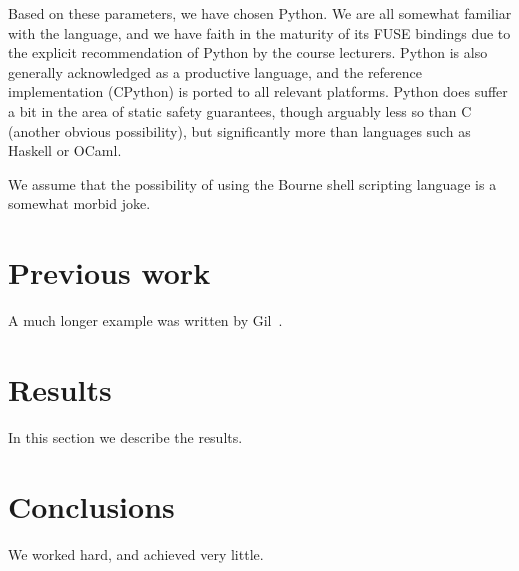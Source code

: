 \documentclass[12pt]{article}
\begin{document}
Based on these parameters, we have chosen Python.  We are all somewhat
familiar with the language, and we have faith in the maturity of its
FUSE bindings due to the explicit recommendation of Python by the
course lecturers.  Python is also generally acknowledged as a
productive language, and the reference implementation (CPython) is
ported to all relevant platforms.  Python does suffer a bit in the
area of static safety guarantees, though arguably less so than C
(another obvious possibility), but significantly more than languages
such as Haskell or OCaml.

We assume that the possibility of using the Bourne shell scripting
language is a somewhat morbid joke.

\section{Previous work}\label{previous work}
A much longer \LaTeXe{} example was written by Gil~\cite{Gil:02}.

\section{Results}\label{results}
In this section we describe the results.

\section{Conclusions}\label{conclusions}
We worked hard, and achieved very little.



\end{document}
